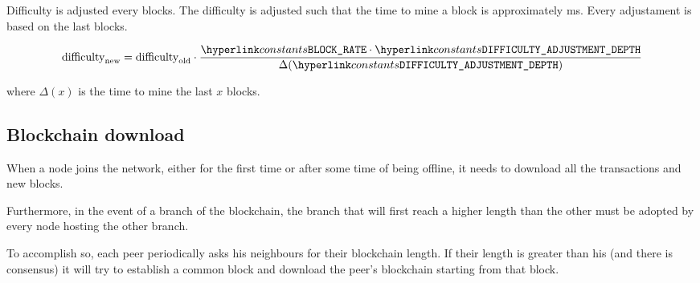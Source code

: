 \documentclass[../documentation.tex]{subfiles}
\begin{document}
Difficulty is adjusted every  blocks.
The difficulty is adjusted such that the time to mine a block is 
approximately  ms.
Every adjustament is based on the last  blocks.

\[
    \text{difficulty}_\text{new} =
    \text{difficulty}_\text{old} \cdot
    \frac{\const{BLOCK\_RATE}\cdot\const{DIFFICULTY\_ADJUSTMENT\_DEPTH}}
    {\Delta(\const{DIFFICULTY\_ADJUSTMENT\_DEPTH})} 
\]

where \(\Delta (x)\) is the time to mine the last \(x\) blocks.

\subsection{Blockchain download}

When a node joins the network, either for the first time
or after some time of being offline, it needs to download
all the transactions and new blocks.

Furthermore, in the event of a branch of the blockchain, the branch
that will first reach a higher length than the other must be adopted
by every node hosting the other branch.

To accomplish so, each peer periodically asks his neighbours for their blockchain length.
If their length is greater than his (and there is consensus) it will try to establish a common block
and download the peer's blockchain starting from that block.

\begin{center}
\end{center}
\end{document}
